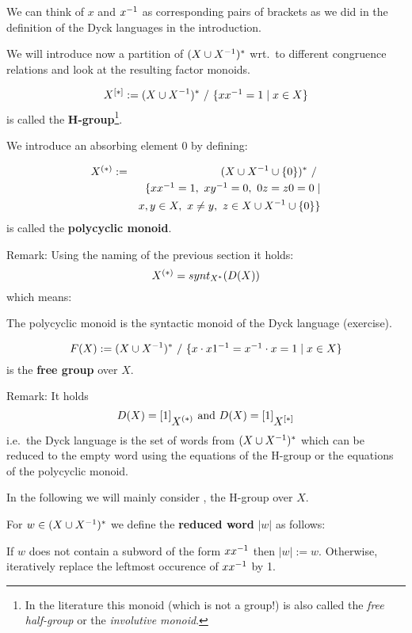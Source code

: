 We can think of $x$ and $\mbox{${x}^{-1}$}$ as corresponding pairs of brackets as we did
in the definition of the Dyck languages in the introduction.

We will introduce now a partition of $(X \cup {X}^{-1})^*$ wrt.\ to different
congruence relations and look at the resulting factor monoids.

\begin{definition}
\[ \hgroup{X} := (\unioninv{X})^*\ /\ \setof{x \inv{x} = 1 \mid x \in X} \]
is called the {\bf H-group}\footnote{In the literature this monoid (which is not a
group!) is also called the {\em free half-group} or the {\em involutive
monoid}.}.
\end{definition}

We introduce an absorbing element $0$ by defining:
\begin{definition}
\begin{eqnarray*}
\mbox{${X}^{(*)}$} & := & (X \cup {X}^{-1} \cup \mbox{$\{0\}$})^*\ /\ \\
& & \{ x \mbox{${x}^{-1}$} = 1,\ x \mbox{${y}^{-1}$} = 0,\ 0 z = z 0 = 0 \mid \\
& & x, y \in X,\ x \neq y,\ z \in X \cup {X}^{-1} \cup \mbox{$\{0\}$} \}
\end{eqnarray*}
is called the {\bf polycyclic monoid}.
\end{definition}

Remark: Using the naming of the previous section it holds:
\[ \mbox{${X}^{(*)}$} = synt_{X^*}(D(X)) \]
which means:

The polycyclic monoid is the syntactic monoid of the Dyck language (exercise).

\begin{definition}
\[ F(X) := (X \cup {X}^{-1})^*\ /\ \mbox{$\{x \cdot \mbox{${x1}^{-1}$} = \mbox{${x}^{-1}$} \cdot x = 1
\mid x \in X\}$} \]
is the {\bf free group} over $X$.
\end{definition}

\label{dyck-language}
Remark: It holds 
\[ D(X) = [1]_{\mbox{${X}^{(*)}$}}\text{ and }D(X) = [1]_{\mbox{${X}^{[*]}$}} \]
i.e.\ the Dyck language is the set of words from $(X \cup {X}^{-1})^*$
which can be reduced to the empty word using the equations of the H-group or the
equations of the polycyclic monoid.

In the following we will mainly consider , the H-group over $X$.

For $w \in (X \cup {X}^{-1})^*$ we define the {\bf reduced word} $|w|$ as follows: 

If $w$ does not contain a subword of the form $x \mbox{${x}^{-1}$}$ then $|w| := w$.
Otherwise, iteratively replace the leftmost occurence of $x \mbox{${x}^{-1}$}$ by 1.

